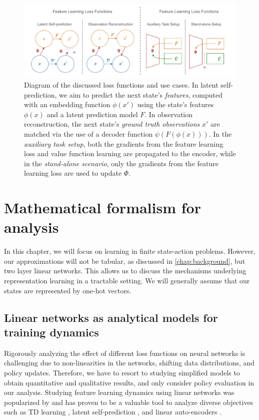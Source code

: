 \begin{figure}
    \centering
    \includegraphics[width=\textwidth]{illustrations/thesis_understanding_overview.pdf}
    \caption{Diagram of the discussed loss functions and use cases. In latent self-prediction, we aim to predict the next state's \emph{features}, computed with an embedding function $\phi(x')$ using the state's features $\phi(x)$ and a latent prediction model $F$. In observation reconstruction, the next state's \emph{ground truth observations} $x'$ are matched via the use of a decoder function $\psi(F(\phi(x)))$. In the \emph{auxiliary task setup}, both the gradients from the feature learning loss and value function learning are propagated to the encoder, while in the \emph{stand-alone scenario}, only the gradients from the feature learning loss are used to update $\Phi$.}
    \label{fig:understanding:losses}
\end{figure}

\section{Mathematical formalism for analysis}
\label{sec:understanding:background}

In this chapter, we will focus on learning in finite state-action problems.
However, our approximations will not be tabular, as discussed in \autoref{chap:background}, but two layer linear networks.
This allows us to discuss the mechanisms underlying representation learning in a tractable setting.
We will generally assume that our states are represented by one-hot vectors.

\subsection{Linear networks as analytical models for training dynamics}

Rigorously analyzing the effect of different loss functions on neural networks is challenging due to non-linearities in the networks, shifting data distributions, and policy updates.
Therefore, we have to resort to studying simplified models to obtain quantitative and qualitative results, and only consider policy evaluation in our analysis.
Studying feature learning dynamics using linear networks was popularized by \textcite{saxe2014exact} and has proven to be a valuable tool to analyze diverse objectives such as TD learning \parencite{tang2023towards,lelan2023bootstrapped}, latent self-prediction \parencite{tian2021understanding,tang2022understanding}, and linear auto-encoders \parencite{pretorius2018learning,bao2020regularized}.

